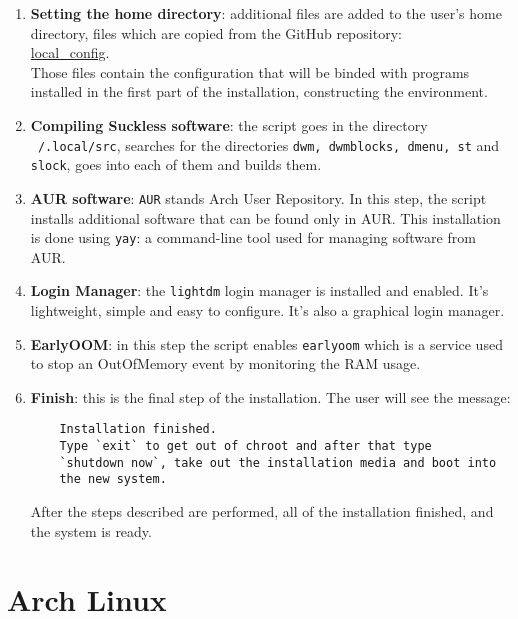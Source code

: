 \documentclass{article}
\begin{document}
\begin{enumerate}
	\item \textbf{Setting the home directory}: additional files are added to the user's home directory,
	files which are copied from the GitHub repository:\\
	\href{https://github.com/arghpy/local_config}{local\_config}.\\
	\newline Those files contain the configuration that will be binded with programs installed in the first part
	of the installation, constructing the environment.
	
	\item \textbf{Compiling Suckless software}: the script goes in the directory \texttt{~/.local/src},
	searches for the directories \texttt{dwm, dwmblocks, dmenu, st} and \texttt{slock}, goes into each of them
	and builds them.
	
	\item \textbf{AUR software}: \texttt{AUR} stands Arch User Repository. In this step, the script installs
	additional software that can be found only in AUR. This installation is done using \texttt{yay}: a
	command-line tool used for managing software from AUR.
	
	\item \textbf{Login Manager}: the \texttt{lightdm} login manager is installed and enabled. It's lightweight,
	simple and easy to configure. It's also a graphical login manager.
	
	\item \textbf{EarlyOOM}: in this step the script enables \texttt{earlyoom} which is a service used to stop an
	OutOfMemory event by monitoring the RAM usage.
	
	\item \textbf{Finish}: this is the final step of the installation. The user will see the message:
	\begin{lstlisting}
	Installation finished.
	Type `exit` to get out of chroot and after that type
	`shutdown now`, take out the installation media and boot into
	the new system.
	\end{lstlisting}
	After the steps described are performed, all of the installation finished, and the system is ready. 
\end{enumerate}
 
\clearpage
\section{Arch Linux}
\end{document}
